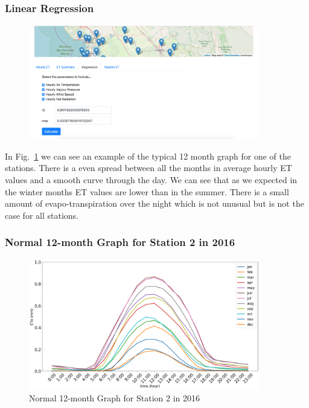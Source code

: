 \begin{frame}
	\frametitle{Linear Regression}
	\centering
	\begin{figure}
		\includegraphics[width=0.9\textwidth]{images/fig3.png}
	\end{figure}
\end{frame}

\begin{frame}
	In Fig.~\ref{fig:2-2016} we can see an example of the typical 12 month graph for one of the stations. There is a even spread between all the months in average hourly ET values and a smooth curve through the day. We can see that as we expected in the winter months ET values are lower than in the summer. There is a small amount of evapo-transpiration over the night which is not unusual but is not the case for all stations. 
\end{frame}

\begin{frame}
\frametitle{Normal 12-month Graph for Station 2 in 2016}
\centering
\begin{figure}
	\includegraphics[width=0.9\textwidth]{images/2-2016.png}
	\caption{Normal 12-month Graph for Station 2 in 2016}\label{fig:2-2016}
\end{figure}
\end{frame}

